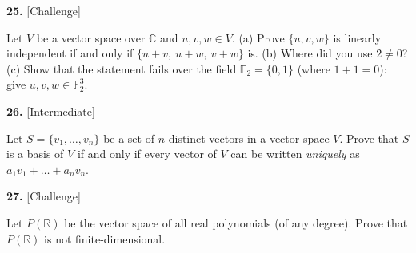 \documentclass[11pt]{article}
\begin{document}
\begin{minipage}{\linewidth}\textbf{25.} \hfill{\scriptsize\color{ink}[Challenge]}\par\nopagebreak Let $V$ be a vector space over $\mathbb{C}$ and $u,v,w\in V$. (a) Prove $\{u,v,w\}$ is linearly independent if and only if $\{u+v,\ u+w,\ v+w\}$ is. (b) Where did you use $2\neq0$? (c) Show that the statement fails over the field $\mathbb{F}_2=\{0,1\}$ (where $1+1=0$): give $u,v,w\in\mathbb{F}_2^{3}$.
\vspace{7.1cm}\end{minipage}\par\vspace{4pt}
\begin{minipage}{\linewidth}\textbf{26.} \hfill{\scriptsize\color{ink}[Intermediate]}\par\nopagebreak Let $S=\{v_1,\dots,v_n\}$ be a set of $n$ distinct vectors in a vector space $V$. Prove that $S$ is a basis of $V$ if and only if every vector of $V$ can be written \emph{uniquely} as $a_1v_1+\dots+a_nv_n$.
\vspace{5.4cm}\end{minipage}\par\vspace{4pt}
\begin{minipage}{\linewidth}\textbf{27.} \hfill{\scriptsize\color{ink}[Challenge]}\par\nopagebreak Let $P(\mathbb{R})$ be the vector space of all real polynomials (of any degree). Prove that $P(\mathbb{R})$ is not finite-dimensional.
\vspace{4.4cm}\end{minipage}\par\vspace{4pt}
\end{document}
